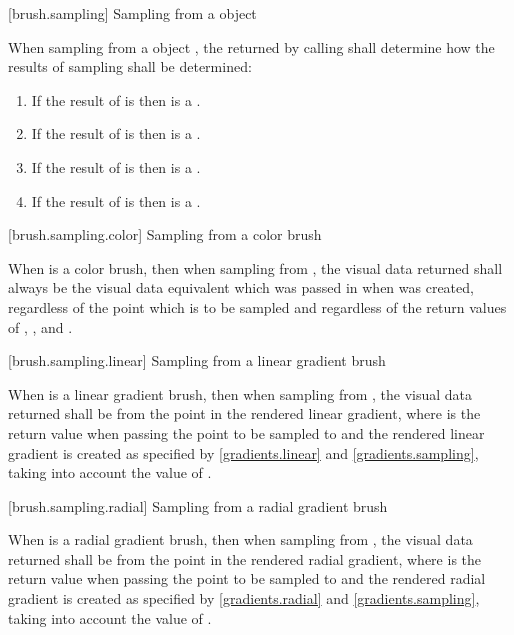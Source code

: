  [brush.sampling] {Sampling from a  object}

\pnum
When sampling from a  object , the  returned by calling  shall determine how the results of sampling shall be determined:
\begin{enumerate}
\item If the result of  is  then  is a .
\item If the result of  is  then  is a .
\item If the result of  is  then  is a .
\item If the result of  is  then  is a .
\end{enumerate}

 [brush.sampling.color] {Sampling from a color brush}

\pnum
When  is a color brush, then when sampling from , the visual data returned shall always be the visual data equivalent  which was passed in when  was created, regardless of the point which is to be sampled and regardless of the return values of , , and .

 [brush.sampling.linear] {Sampling from a linear gradient brush}

\pnum
When  is a linear gradient brush, then when sampling from , the visual data returned shall be from the point  in the rendered linear gradient, where  is the return value when passing the point to be sampled to  and the rendered linear gradient is created as specified by \ref{gradients.linear} and \ref{gradients.sampling}, taking into account the value of .

 [brush.sampling.radial] {Sampling from a radial gradient brush}

\pnum
When  is a radial gradient brush, then when sampling from , the visual data returned shall be from the point  in the rendered radial gradient, where  is the return value when passing the point to be sampled to  and the rendered radial gradient is created as specified by \ref{gradients.radial} and \ref{gradients.sampling}, taking into account the value of .

